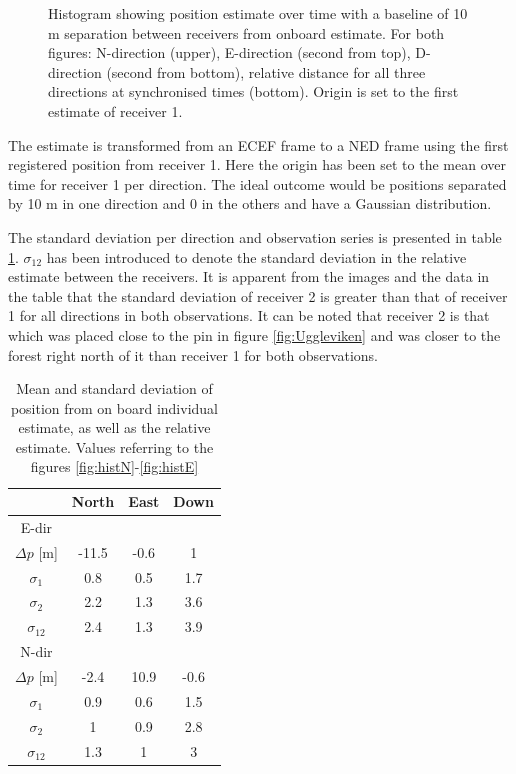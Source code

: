 \begin{figure}
\begin{subfigure}{\textwidth}
\end{subfigure}
\caption{Histogram showing position estimate over time with a baseline of 10 m separation between receivers from onboard estimate. For both figures: N-direction (upper), E-direction (second from top), D-direction (second from bottom), relative distance for all three directions at synchronised times (bottom). Origin is set to the first estimate of receiver 1.}
\end{figure}
The estimate is transformed from an ECEF frame to a NED frame using the first registered position from receiver 1. Here the origin has been set to the mean over time for receiver 1 per direction. The ideal outcome would be positions separated by 10 m in one direction and 0 in the others and have a Gaussian distribution. 
\par
The standard deviation per direction and observation series is presented in table \ref{table:resultsHistIS}. $\sigma_{12}$ has been introduced to denote the standard deviation in the relative estimate between the receivers. It is apparent from the images and the data in the table that the standard deviation of receiver 2 is greater than that of receiver 1 for all directions in both observations. It can be noted that receiver 2 is that which was placed close to the pin in figure \ref{fig:Uggleviken} and was closer to the forest right north of it than receiver 1 for both observations.
\begin{table}[h!]
  \begin{center}
    \begin{tabular}{|c|c|c|c|}\hline
		& \textbf{North} & \textbf{East}& \textbf{Down}\\
      \hline
      	E-dir \\ \hline
      	$\Delta p $ [m]& -11.5 & -0.6 & 1\\ \hline
		$\sigma_1$& 0.8 & 0.5 & 1.7 \\\hline
		$\sigma_2$ & 2.2 & 1.3 & 3.6 \\ \hline
		$\sigma_{12}$& 2.4 & 1.3 & 3.9 \\ \hline
		N-dir\\ \hline
		$\Delta p $ [m]& -2.4& 10.9 & -0.6 \\ \hline
		$\sigma_1$& 0.9 & 0.6 & 1.5 \\\hline
		$\sigma_2$ & 1 & 0.9 & 2.8 \\ \hline
		$\sigma_{12}$ & 1.3 & 1 & 3 \\ \hline
    \end{tabular}
    \caption{\label{table:resultsHistIS} Mean and standard deviation of position from on board individual estimate, as well as the relative estimate. Values referring to the figures \ref{fig:histN}-\ref{fig:histE}}
  \end{center}
\end{table}

